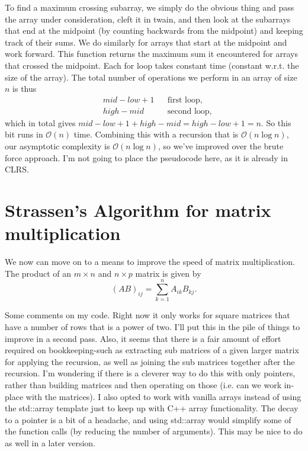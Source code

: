 \documentclass[12pt,english]{article}
\begin{document}
To find a maximum crossing subarray, we simply do the obvious thing and pass the array under consideration, cleft it in twain, and then look at the subarrays that end at the midpoint (by counting backwards from the midpoint) and keeping track of their sums.  We do similarly for arrays that start at the midpoint and work forward.  This function returns the maximum sum it encountered for arrays that crossed the midpoint.  Each for loop takes constant time (constant w.r.t. the size of the array).  The total number of operations we perform in an array of size $n$ is thus
$$
\begin{aligned}
&mid-low + 1			&& \text{first loop,} \\
&high - mid			&& \text{second loop,}
\end{aligned}
$$
which in total gives $mid - low + 1 + high - mid = high - low + 1 = n$.  So this bit runs in $\mathcal{O}(n)$ time. Combining this with a recursion that is $\mathcal{O}(n \log n)$, our asymptotic complexity is $\mathcal{O}(n \log n)$, so we've improved over the brute force approach.  I'm not going to place the pseudocode here, as it is already in CLRS.  

\section{Strassen's Algorithm for matrix multiplication}

We now can move on to a means to improve the speed of matrix multiplication.  The product of an $m \times n$ and $n \times p$ matrix is given by
$$
(AB)_{ij} = \sum_{k=1}^n A_{ik}B_{kj}.
$$

Some comments on my code.  Right now it only works for square matrices that have a number of rows that is a power of two.  I'll put this in the pile of things to improve in a second pass.  Also, it seems that there is a fair amount of effort required on bookkeeping-such as extracting sub matrices of a given larger matrix for applying the recursion, as well as joining the sub matrices together after the recursion.  I'm wondering if there is a cleverer way to do this with only pointers, rather than building matrices and then operating on those (i.e. can we work in-place with the matrices).  I also opted to work with vanilla arrays instead of using the std::array template just to keep up with C++ array functionality.  The decay to a pointer is a bit of a headache, and using std::array would simplify some of the function calls (by reducing the number of arguments).  This may be nice to do as well in a later version.
\end{document}
